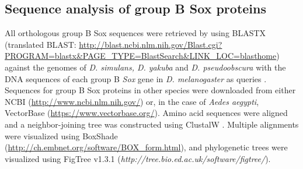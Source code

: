 \subsection{Sequence analysis of group B Sox proteins}
All orthologous group B Sox sequences were retrieved by using BLASTX (translated BLAST: \url{http://blast.ncbi.nlm.nih.gov/Blast.cgi?PROGRAM=blastx&PAGE_TYPE=BlastSearch&LINK_LOC=blasthome}) against the genomes of \emph{D. simulans, D. yakuba} and \emph{D. pseudoobscura} with the DNA sequences of each group B \emph{Sox} gene in \emph{D. melanogaster} as queries \citep{altschul_basic_1990}. Sequences for group B Sox proteins in other species were downloaded from either NCBI (\url{http://www.ncbi.nlm.nih.gov/}) or, in the case of \emph{Aedes aegypti}, VectorBase (\url{https://www.vectorbase.org/}). Amino acid sequences were aligned and a neighbor-joining tree was constructed using ClustalW \citep{chenna_multiple_2003}. Multiple alignments were visualized using BoxShade (\url{http://ch.embnet.org/software/BOX_form.html}), and phylogenetic trees were visualized using FigTree v1.3.1 (\emph{http://tree.bio.ed.ac.uk/software/figtree/}).

